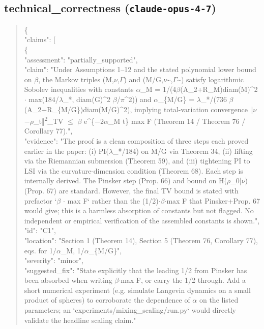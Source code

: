 \documentclass[11pt]{article}
\begin{document}
\subsection*{technical\_correctness (\texttt{claude-opus-4-7})}
\begin{quote}\small\ttfamily\raggedright
\{\\
  "claims": [\\
    \{\\
      "assessment": "partially\_supported",\\
      "claim": "Under Assumptions 1--12 and the stated polynomial lower bound on \ensuremath{\beta}, the Markov triples (M,\ensuremath{\nu},\ensuremath{\Gamma}) and (M/G,\ensuremath{\nu}\~{},\ensuremath{\Gamma}\~{}) satisfy logarithmic Sobolev inequalities with constants \ensuremath{\alpha}\_M = 1/(4\ensuremath{\beta}(A\_2+R\_M)diam(M)\^{}2 \ensuremath{\cdot} max(184/\ensuremath{\lambda}\_*, diam(G)\^{}2 \ensuremath{\beta}/\ensuremath{\pi}\^{}2)) and \ensuremath{\alpha}\_\{M/G\} = \ensuremath{\lambda}\_*/(736 \ensuremath{\beta}(A\_2+R\_\{M/G\})diam(M/G)\^{}2), implying total-variation convergence ‖\ensuremath{\nu}\ensuremath{-}\ensuremath{\rho}\_t‖\textsuperscript{2}\_TV \ensuremath{\le} \ensuremath{\beta} e\^{}\{\ensuremath{-}2\ensuremath{\alpha}\_M t\} max F (Theorem 14 / Theorem 76 / Corollary 77).",\\
      "evidence": "The proof is a clean composition of three steps each proved earlier in the paper: (i) PI(\ensuremath{\lambda}\_*/184) on M/G via Theorem 34, (ii) lifting via the Riemannian submersion (Theorem 59), and (iii) tightening PI to LSI via the curvature-dimension condition (Theorem 68). Each step is internally derived. The Pinsker step (Prop. 66) and bound on H(\ensuremath{\rho}\_0|\ensuremath{\nu}) (Prop. 67) are standard. However, the final TV bound is stated with prefactor `\ensuremath{\beta} \ensuremath{\cdot} max F` rather than the (1/2)\ensuremath{\cdot}\ensuremath{\beta}\ensuremath{\cdot}max F that Pinsker+Prop. 67 would give; this is a harmless absorption of constants but not flagged. No independent or empirical verification of the assembled constants is shown.",\\
      "id": "C1",\\
      "location": "Section 1 (Theorem 14), Section 5 (Theorem 76, Corollary 77), eqs. for 1/\ensuremath{\alpha}\_M, 1/\ensuremath{\alpha}\_\{M/G\}",\\
      "severity": "minor",\\
      "suggested\_fix": "State explicitly that the leading 1/2 from Pinsker has been absorbed when writing \ensuremath{\beta}\ensuremath{\cdot}max F, or carry the 1/2 through. Add a short numerical experiment (e.g. simulate Langevin dynamics on a small product of spheres) to corroborate the dependence of \ensuremath{\alpha} on the listed parameters; an `experiments/mixing\_scaling/run.py` would directly validate the headline scaling claim."\\

\end{quote}
\end{document}
